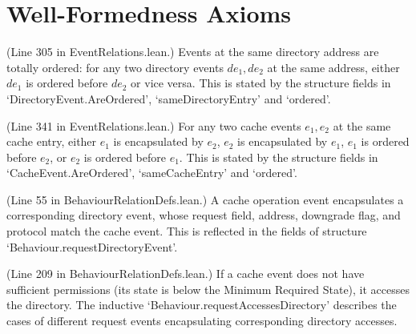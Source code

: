 \section{Well-Formedness Axioms}
\label{sec:axioms:well-formedness}

\begin{definition}
  \label{def:DirectoryEventAreOrdered}
  \leanok
  (Line 305 in EventRelations.lean.)
  Events at the same directory address are totally ordered:
  for any two directory events $de_1, de_2$ at the same address,
  either $de_1$ is ordered before $de_2$ or vice versa.
  This is stated by the structure fields in `DirectoryEvent.AreOrdered',
  `sameDirectoryEntry' and `ordered'.
\end{definition}

\begin{definition}
  \label{def:CacheEventAreOrdered}
  \leanok
  (Line 341 in EventRelations.lean.)
  For any two cache events $e_1, e_2$ at the same cache entry,
  either $e_1$ is encapsulated by $e_2$, $e_2$ is encapsulated by
  $e_1$, $e_1$ is ordered before $e_2$, or $e_2$ is ordered before $e_1$.
  This is stated by the structure fields in `CacheEvent.AreOrdered',
  `sameCacheEntry' and `ordered'.
\end{definition}

\begin{definition}
  \label{def:requestDirectoryEvent}
  \leanok
  (Line 55 in BehaviourRelationDefs.lean.)
  A cache operation event encapsulates a corresponding directory event,
  whose request field, address, downgrade flag, and protocol match
  the cache event.
  This is reflected in the fields of structure `Behaviour.requestDirectoryEvent'.
\end{definition}

\begin{definition}
  \label{def:axRequestAccessesDirectory}
  \leanok
  (Line 209 in BehaviourRelationDefs.lean.)
  If a cache event does not have sufficient permissions (its state is below
  the Minimum Required State), it accesses the directory.
  The inductive `Behaviour.requestAccessesDirectory' describes the cases of different request events
  encapsulating corresponding directory accesses.
\end{definition}

